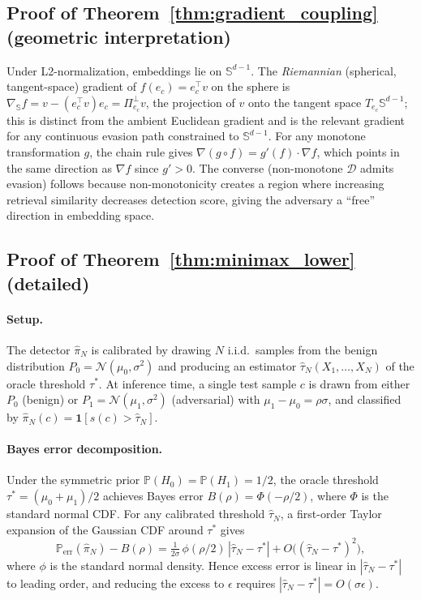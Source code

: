 \documentclass{article}
\theoremstyle{definition}
\newcommand{\PP}{\mathbb{P}}
\newcommand{\cD}{\mathcal{D}}
\newcommand{\cN}{\mathcal{N}}
\begin{document}
\subsection{Proof of Theorem~\ref{thm:gradient_coupling} (geometric interpretation)}
\label{app:proof_gradient}

Under L2-normalization, embeddings lie on $\mathbb{S}^{d-1}$. The \emph{Riemannian} (spherical, tangent-space) gradient of $f(e_c) = e_c^\top v$ on the sphere is $\nabla_{\mathbb{S}} f = v - (e_c^\top v) e_c = \Pi_{e_c}^{\perp} v$, the projection of $v$ onto the tangent space $T_{e_c}\mathbb{S}^{d-1}$; this is distinct from the ambient Euclidean gradient and is the relevant gradient for any continuous evasion path constrained to $\mathbb{S}^{d-1}$. For any monotone transformation $g$, the chain rule gives $\nabla(g \circ f) = g'(f) \cdot \nabla f$, which points in the same direction as $\nabla f$ since $g' > 0$. The converse (non-monotone $\cD$ admits evasion) follows because non-monotonicity creates a region where increasing retrieval similarity decreases detection score, giving the adversary a ``free'' direction in embedding space.

\subsection{Proof of Theorem~\ref{thm:minimax_lower} (detailed)}
\label{app:proof_minimax}

\paragraph{Setup.} The detector $\hat\pi_N$ is calibrated by drawing $N$ i.i.d.\ samples from the benign distribution $P_0 = \cN(\mu_0, \sigma^2)$ and producing an estimator $\hat\tau_N(X_1, \ldots, X_N)$ of the oracle threshold $\tau^*$. At inference time, a single test sample $c$ is drawn from either $P_0$ (benign) or $P_1 = \cN(\mu_1, \sigma^2)$ (adversarial) with $\mu_1 - \mu_0 = \rho\sigma$, and classified by $\hat\pi_N(c) = \mathbf{1}[s(c) > \hat\tau_N]$.

\paragraph{Bayes error decomposition.} Under the symmetric prior $\PP(H_0) = \PP(H_1) = 1/2$, the oracle threshold $\tau^* = (\mu_0+\mu_1)/2$ achieves Bayes error $B(\rho) = \Phi(-\rho/2)$, where $\Phi$ is the standard normal CDF. For any calibrated threshold $\hat\tau_N$, a first-order Taylor expansion of the Gaussian CDF around $\tau^*$ gives
\begin{equation}
  \PP_{\text{err}}(\hat\pi_N) - B(\rho) = \tfrac{1}{2\sigma}\,\phi(\rho/2)\,|\hat\tau_N - \tau^*| + O\big((\hat\tau_N-\tau^*)^2\big),
  \label{eq:excess-error}
\end{equation}
where $\phi$ is the standard normal density. Hence excess error is linear in $|\hat\tau_N - \tau^*|$ to leading order, and reducing the excess to $\epsilon$ requires $|\hat\tau_N - \tau^*| = O(\sigma\epsilon)$.
\end{document}
